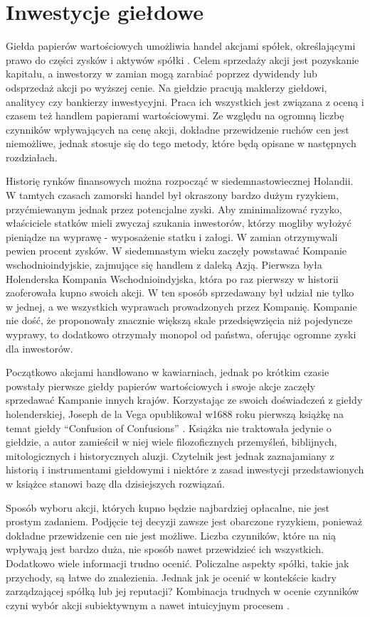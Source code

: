 \documentclass[twoside]{iisthesis}
\begin{document}
\section{Inwestycje giełdowe}

Giełda papierów wartościowych umożliwia handel akcjami spółek, określającymi prawo do części zysków i aktywów spółki \cite{stockMarketInvestopedia}. Celem sprzedaży akcji jest pozyskanie kapitału, a inwestorzy w zamian mogą zarabiać poprzez dywidendy lub odsprzedaż akcji po wyższej cenie. Na giełdzie pracują maklerzy giełdowi, analitycy czy bankierzy inwestycyjni. Praca ich wszystkich jest związana z oceną i czasem też handlem papierami wartościowymi. Ze względu na ogromną liczbę czynników wpływających na cenę akcji, dokładne przewidzenie ruchów cen jest niemożliwe, jednak stosuje się do tego metody, które będą opisane w następnych rozdziałach. 

Historię rynków finansowych można rozpocząć w siedemnastowiecznej Holandii. W tamtych czasach zamorski handel był okraszony bardzo dużym ryzykiem, przyćmiewanym jednak przez potencjalne zyski. Aby zminimalizować ryzyko, właściciele statków mieli zwyczaj szukania inwestorów, którzy mogliby wyłożyć pieniądze na wyprawę - wyposażenie statku i załogi. W zamian otrzymywali pewien procent zysków. W siedemnastym wieku zaczęły powstawać Kompanie wschodnioindyjskie, zajmujące się handlem z daleką Azją. Pierwsza była Holenderska Kompania Wschodnioindyjska, która po raz pierwszy w historii zaoferowała kupno swoich akcji. W ten sposób sprzedawany był udział nie tylko w jednej, a we wszystkich wyprawach prowadzonych przez Kompanię. Kompanie nie dość, że proponowały znacznie większą skale przedsięwzięcia niż pojedyncze wyprawy, to dodatkowo otrzymały monopol od państwa, oferując ogromne zyski dla inwestorów.

Początkowo akcjami handlowano w kawiarniach, jednak po krótkim czasie powstały pierwsze giełdy papierów wartościowych i swoje akcje zaczęły sprzedawać Kampanie innych krajów. Korzystając ze swoich doświadczeń z giełdy holenderskiej, Joseph de la Vega opublikował w1688 roku pierwszą książkę na temat giełdy ``Confusion of Confusions''  \cite{Confusion}. Książka nie traktowała jedynie o giełdzie, a autor zamieścił w niej wiele filozoficznych przemyśleń, biblijnych, mitologicznych i historycznych aluzji. Czytelnik jest jednak zaznajamiany z historią i instrumentami giełdowymi i niektóre z zasad inwestycji przedstawionych w książce stanowi bazę dla dzisiejszych rozwiązań. 

Sposób wyboru akcji, których kupno będzie najbardziej opłacalne, nie jest prostym zadaniem. Podjęcie tej decyzji zawsze jest obarczone ryzykiem, ponieważ dokładne przewidzenie cen nie jest możliwe. Liczba czynników, które na nią wpływają jest bardzo duża, nie sposób nawet przewidzieć ich wszystkich. Dodatkowo wiele informacji trudno ocenić. Policzalne aspekty spółki, takie jak przychody, są łatwe do znalezienia. Jednak jak je ocenić w kontekście kadry zarządzającej spółką lub jej reputacji? Kombinacja trudnych w ocenie czynników czyni wybór akcji subiektywnym a nawet intuicyjnym procesem  \cite{stockPickingInvestopedia}. 
\end{document}
